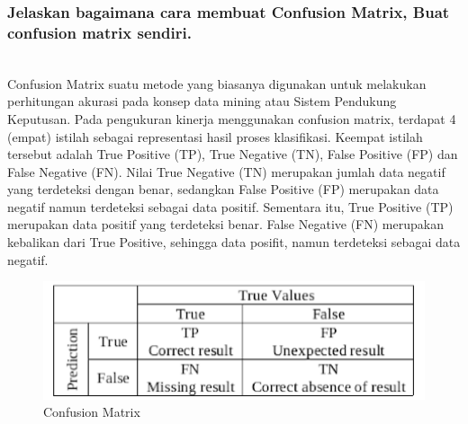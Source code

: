 \subsubsection{Jelaskan bagaimana cara membuat Confusion Matrix, Buat confusion matrix sendiri.}
\hfill\\
Confusion Matrix suatu metode yang biasanya digunakan untuk melakukan perhitungan akurasi pada konsep data mining atau Sistem Pendukung Keputusan. Pada pengukuran kinerja menggunakan confusion matrix, terdapat 4 (empat) istilah sebagai representasi hasil proses klasifikasi. Keempat istilah tersebut adalah True Positive (TP), True Negative (TN), False Positive (FP) dan False Negative (FN). Nilai True Negative (TN) merupakan jumlah data negatif yang terdeteksi dengan benar, sedangkan False Positive (FP) merupakan data negatif namun terdeteksi sebagai data positif. Sementara itu, True Positive (TP) merupakan data positif yang terdeteksi benar. False Negative (FN) merupakan kebalikan dari True Positive, sehingga data posifit, namun terdeteksi sebagai data negatif.

\begin{figure}[H]
    \includegraphics[width=12cm]{figures/1174077/2/cm.png}
    \centering
    \caption{Confusion Matrix}
\end{figure}	

